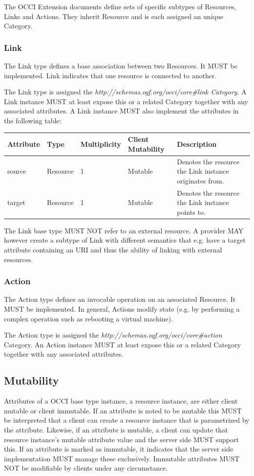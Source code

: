 \documentclass[10pt,a4paper]{article}
\begin{document}
The OCCI Extension documents define sets of specific subtypes of
Resources, Links and Actions. They inherit Resource and is each
assigned an unique Category.

\subsubsection{Link}
The Link type defines a base association between two Resources. It
MUST be implemented. Link indicates that one resource is connected to
another.

The Link type is assigned the
\textit{http://schemas.ogf.org/occi/core\#link Category}. A Link
instance MUST at least expose this or a related Category together with
any associated attributes. A Link instance MUST also implement the
attributes in the following table:

\begin{tabular}{l|l|l|l|p{2.7in}}
Attribute & Type & Multiplicity & Client Mutability & Description \\
\hline
source & Resource & 1 & Mutable & Denotes the resource the Link instance originates from.\\
target & Resource & 1 & Mutable & Denotes the resource the Link instance points to.\\
\end{tabular}

The Link base type MUST NOT refer to an external resource. A provider
MAY however create a subtype of Link with different semantics that
e.g. have a target attribute containing an URI and thus the ability of
linking with external resources.

\subsubsection{Action}
The Action type defines an invocable operation on an associated
Resource. It MUST be implemented. In general, Actions modify state
(e.g. by performing a complex operation such as rebooting a virtual
machine).

The Action type is assigned the
\textit{http://schemas.ogf.org/occi/core\#action} Category. An Action
instance MUST at least expose this or a related Category together with
any associated attributes.

\subsection{Mutability}
Attributes of a OCCI base type instance, a resource instance, are
either client mutable or client immutable. If an attribute is noted to
be mutable this MUST be interpreted that a client can create a
resource instance that is parametrized by the attribute. Likewise, if
an attribute is mutable, a client can update that resource instance's
mutable attribute value and the server side MUST support this. If an
attribute is marked as immutable, it indicates that the server side
implementation MUST manage these exclusively. Immutable attributes
MUST NOT be modifiable by clients under any circumstance.
\end{document}

